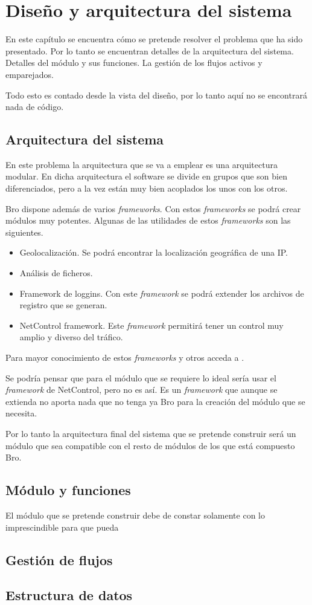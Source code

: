 \chapter{Diseño y arquitectura del sistema}

En este capítulo se encuentra cómo se pretende resolver el problema que ha sido presentado. Por lo tanto 
se encuentran detalles de la arquitectura del sistema. Detalles del módulo y sus funciones. La gestión de 
los flujos activos y emparejados.

\intro Todo esto es contado desde la vista del diseño, por lo tanto aquí no se encontrará nada de código.

\section{Arquitectura del sistema}

En este problema la arquitectura que se va a emplear es una arquitectura modular. En dicha arquitectura el software 
se divide en grupos que son bien diferenciados, pero a la vez están muy bien acoplados los unos con los otros.

\intro Bro dispone además de varios \textit{frameworks}. Con estos \textit{frameworks} se podrá crear módulos muy 
potentes. Algunas de las utilidades de estos \textit{frameworks} son las siguientes.
\begin{itemize}
\item Geolocalización. Se podrá encontrar la localización geográfica de una IP.
\item Análisis de ficheros. 
\item Framework de loggins. Con este \textit{framework} se podrá extender los archivos de registro que se generan.
\item NetControl framework. Este \textit{framework} permitirá tener un control muy amplio y diverso del tráfico.
\end{itemize}

\intro Para mayor conocimiento de estos \textit{frameworks} y otros acceda a \cite{broframeworks}.

\intro Se podría pensar que para el módulo que se requiere lo ideal sería usar el \textit{framework} de NetControl, 
pero no es así. Es un \textit{framework} que aunque se extienda no aporta nada que no tenga ya Bro para la creación 
del módulo que se necesita.

\intro Por lo tanto la arquitectura final del sistema que se pretende construir será un módulo que sea compatible 
con el resto de módulos de los que está compuesto Bro.

\section{Módulo y funciones}

El módulo que se pretende construir debe de constar solamente con lo imprescindible para que pueda 


\section{Gestión de flujos}



\section{Estructura de datos}

